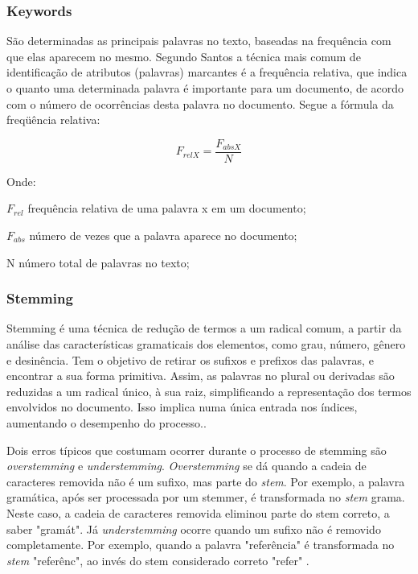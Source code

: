 \subsubsection{Keywords}

São determinadas as principais palavras no texto, baseadas na frequência com que elas aparecem no mesmo. Segundo Santos \cite{wives1999estudo} a técnica mais comum de identificação de  atributos (palavras) marcantes é a frequência relativa, que indica o quanto uma determinada palavra é importante para um documento, de acordo com o número de ocorrências desta palavra no documento. Segue a fórmula da freqüência relativa:

\begin{equation}
	F_{relX} = \frac{F_{absX}}{N}
\end{equation}

Onde:

$F_{rel}$ frequência relativa de uma palavra x em um documento; 

$F_{abs}$ número de vezes que a palavra aparece no documento; 

N número total de palavras no texto;\

\subsubsection{Stemming}

Stemming é uma técnica de redução de termos a um radical comum, a partir da análise das características gramaticais dos elementos, como grau, número, gênero e desinência. Tem o objetivo de retirar os sufixos e prefixos das palavras, e encontrar a sua forma primitiva. Assim, as palavras no plural ou derivadas são reduzidas a um radical único, à sua raiz, simplificando a representação dos termos envolvidos no documento. Isso implica numa única entrada nos índices, aumentando o desempenho do processo.\cite{maria2012}.

Dois erros típicos que costumam ocorrer durante o processo de stemming são \textit{overstemming} e \textit{understemming}. \textit{Overstemming} se dá quando a cadeia de caracteres removida não é um sufixo, mas parte do \textit{stem}. Por exemplo, a palavra gramática, após ser processada por um stemmer, é transformada no \textit{stem} grama. Neste caso, a cadeia de caracteres removida eliminou parte do stem correto, a saber "gramát". Já \textit{understemming} ocorre quando um sufixo não é removido completamente. Por exemplo, quando a palavra "referência" é transformada no \textit{stem}  "referênc", ao invés do stem considerado correto  "refer" \cite{uber2004}.  


